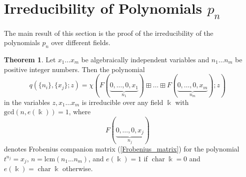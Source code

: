 \documentclass[14pt, dvipsnames]{extarticle}
\theoremstyle{definition}
\newtheorem{theorem}{Theorem}
\theoremstyle{definition}
\theoremstyle{remark}
\DeclareMathOperator{\kk}{\Bbbk}
\DeclareMathOperator{\charr}{\mathrm{char}}
\begin{document}
\section{Irreducibility of Polynomials $p_n$}\label{nonderogatory}

The main result of this section is the proof of the irreducibility of the polynomials $p_n$ over different fields.

\begin{theorem}\label{trans_extension}
Let $x_1\dots x_m$ be algebraically independent variables and $n_1\dots n_m$ be positive integer numbers. Then the polynomial
\begin{equation}\label{sum_of_Frobenius_cells}q(\{n_i\}, \{x_j\}; z) =  \chi(F(\underset{n_1}{\underbrace{0,…,0, x_1}})\boxplus…\boxplus F(\underset{n_m}{\underbrace{0,…,0, x_m}}); z)\end{equation}
in the variables $z, x_1\dots x_m$ is irreducible over any field $\kk$ with $\text{gcd}(n, e(\kk)) = 1$, where $$F(\underset{n_j}{\underbrace{0,…,0, x_j}})$$ denotes Frobenius companion matrix (\ref{Frobenius_matrix}) for the polynomial $t^{n_j} = x_j$, $n = \text{lcm}(n_1\dots n_m)$, and $e(\kk) = 1$ if $\charr\kk = 0$ and $e(\kk) = \charr\kk$ otherwise.
\end{theorem}
\end{document}

